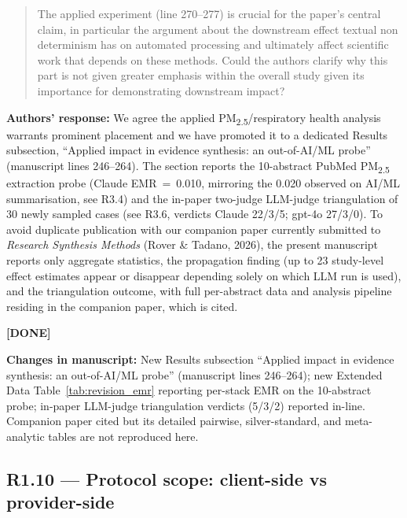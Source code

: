 \documentclass[11pt,a4paper]{article}
\newenvironment{revquote}{%
  \begin{quote}\small\itshape\color{revgray}
}{%
  \end{quote}
}
\newcommand{\response}[1]{\par\noindent\textbf{\color{revgreen}Authors' response:} #1\par}
\newcommand{\changes}[1]{\par\noindent\textbf{\color{revblue}Changes in manuscript:} #1\par}
\newcommand{\done}{\color{revgreen}\textbf{[DONE]}}
\begin{document}
\begin{revquote}
The applied experiment (line 270--277) is crucial for the paper's central claim, in particular the argument about the downstream effect textual non determinism has on automated processing and ultimately affect scientific work that depends on these methods. Could the authors clarify why this part is not given greater emphasis within the overall study given its importance for demonstrating downstream impact?
\end{revquote}

\response{We agree the applied PM\textsubscript{2.5}/respiratory health analysis warrants prominent placement and we have promoted it to a dedicated Results subsection, ``Applied impact in evidence synthesis: an out-of-AI/ML probe'' (manuscript lines 246--264). The section reports the 10-abstract PubMed PM\textsubscript{2.5} extraction probe (Claude EMR~=~0.010, mirroring the 0.020 observed on AI/ML summarisation, see R3.4) and the in-paper two-judge LLM-judge triangulation of 30 newly sampled cases (see R3.6, verdicts Claude 22/3/5; gpt-4o 27/3/0). To avoid duplicate publication with our companion paper currently submitted to \emph{Research Synthesis Methods} (Rover \& Tadano, 2026), the present manuscript reports only aggregate statistics, the propagation finding (up to 23 study-level effect estimates appear or disappear depending solely on which LLM run is used), and the triangulation outcome, with full per-abstract data and analysis pipeline residing in the companion paper, which is cited.} \done

\changes{New Results subsection ``Applied impact in evidence synthesis: an out-of-AI/ML probe'' (manuscript lines 246--264); new Extended Data Table~\ref{tab:revision_emr} reporting per-stack EMR on the 10-abstract probe; in-paper LLM-judge triangulation verdicts (5/3/2) reported in-line. Companion paper cited but its detailed pairwise, silver-standard, and meta-analytic tables are not reproduced here.}

\subsection*{R1.10 --- Protocol scope: client-side vs provider-side}
\end{document}

